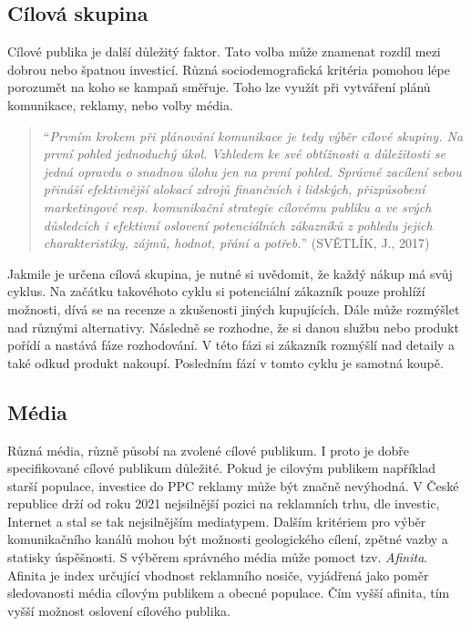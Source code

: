 \subsection{Cílová skupina}
Cílové publika je další důležitý faktor. Tato volba může znamenat rozdíl mezi dobrou nebo špatnou investicí. Různá sociodemografická kritéria pomohou lépe porozumět
na koho se kampaň směřuje. Toho lze využít při vytváření plánů komunikace, reklamy, nebo volby média.
\begin{quote}
    \enquote{\emph{Prvním krokem
    při plánování komunikace je tedy výběr cílové skupiny. Na první pohled jednoduchý úkol. Vzhledem
    ke své obtížnosti a důležitosti se jedná opravdu o snadnou úlohu jen na první pohled. Správné zacílení
    sebou přináší efektivnější alokací zdrojů finančních i lidských, přizpůsobení marketingové resp.
    komunikační strategie cílovému publiku a ve svých důsledcích i efektivní oslovení potenciálních
    zákazníků z pohledu jejich charakteristiky, zájmů, hodnot, přání a potřeb.}} (SVĚTLÍK, J., 2017) \cite{svetlik:reklama}
\end{quote}

Jakmile je určena cílová skupina, je nutné si uvědomit, že každý nákup má svůj cyklus. Na začátku takovéhoto cyklu si potenciální zákazník pouze prohlíží
možnosti, dívá se na recenze a zkušenosti jiných kupujících. Dále může rozmýšlet nad různými alternativy. Následně se rozhodne, že si danou službu nebo produkt
pořídí a nastává fáze rozhodování. V této fázi si zákazník rozmýšlí nad detaily a také odkud produkt nakoupí. Posledním fází v tomto cyklu je samotná koupě.
\cite{marketing:strategy}


\subsection{Média}
Různá média, různě působí na zvolené cílové publikum. I proto je dobře specifikované cílové publikum důležité. Pokud je cilovým publikem například starší populace, investice
do PPC reklamy může být značně nevýhodná. V České republice drží od roku 2021 nejsilnější pozici na reklamních trhu, dle investic, Internet a stal se tak nejsilnějším mediatypem. \cite{spir:mediatypes}
Dalším kritériem pro výběr komunikačního kanálů mohou být možnosti geologického cílení, zpětné vazby a statisky úspěšnosti.
S výběrem správného média může pomoct tzv. \emph{Afinita}. Afinita je index určující vhodnost reklamního nosiče, vyjádřená jako poměr sledovanosti média cílovým publikem
a obecné populace. Čím vyšší afinita, tím vyšší možnost oslovení cílového publika. \cite{mediaguru:afinita}

